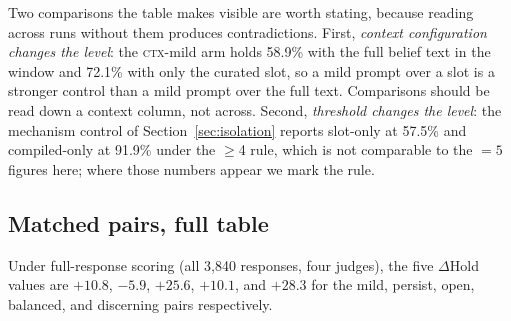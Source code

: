 Two comparisons the table makes visible are worth stating, because reading across runs without
them produces contradictions. First, \emph{context configuration changes the level}: the
\textsc{ctx}-mild arm holds 58.9\% with the full belief text in the window and 72.1\% with only
the curated slot, so a mild prompt over a slot is a stronger control than a mild prompt over the
full text. Comparisons should be read down a context column, not across. Second, \emph{threshold
changes the level}: the mechanism control of Section~\ref{sec:isolation} reports slot-only at
57.5\% and compiled-only at 91.9\% under the \(\ge\)4 rule, which is not comparable to the
\(=5\) figures here; where those numbers appear we mark the rule.


\subsection{Matched pairs, full table}
\label{app:matched-fulltext-note}
Under full-response scoring (all 3{,}840 responses, four judges), the five \(\Delta\)Hold
values are \(+10.8\), \(-5.9\), \(+25.6\), \(+10.1\), and \(+28.3\) for the mild,
persist, open, balanced, and discerning pairs respectively.
\label{app:matched}
